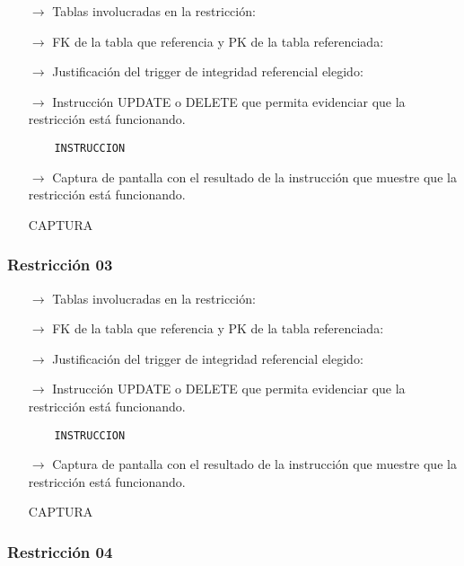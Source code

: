 \begin{itemize}
    \item[$\rightarrow$] Tablas involucradas en la restricción: 
    \item[$\rightarrow$] FK de la tabla que referencia y PK de la tabla referenciada: 
    \item[$\rightarrow$] Justificación del trigger de integridad referencial elegido: 
    \item[$\rightarrow$] Instrucción UPDATE o DELETE que permita evidenciar que la restricción está
    funcionando.
    \begin{verbatim}
    INSTRUCCION
    \end{verbatim}
    \item[$\rightarrow$] Captura de pantalla con el resultado de la instrucción que muestre que la restricción está
    funcionando.
    \begin{center}
        CAPTURA
    \end{center}
\end{itemize}

\subsubsection*{Restricción 03}

\begin{itemize}
    \item[$\rightarrow$] Tablas involucradas en la restricción: 
    \item[$\rightarrow$] FK de la tabla que referencia y PK de la tabla referenciada: 
    \item[$\rightarrow$] Justificación del trigger de integridad referencial elegido: 
    \item[$\rightarrow$] Instrucción UPDATE o DELETE que permita evidenciar que la restricción está
    funcionando.
    \begin{verbatim}
    INSTRUCCION
    \end{verbatim}
    \item[$\rightarrow$] Captura de pantalla con el resultado de la instrucción que muestre que la restricción está
    funcionando.
    \begin{center}
        CAPTURA
    \end{center}
\end{itemize}

\subsubsection*{Restricción 04}

